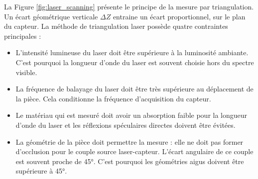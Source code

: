 La Figure \ref{fig:laser_scanning} présente le principe de la mesure par triangulation.
Un écart géométrique verticale $\Delta Z$ entraine un écart proportionnel, sur le plan du capteur.
La méthode de triangulation laser possède quatre contraintes principales :
\begin{itemize}
	\item L'intensité lumineuse du laser doit être supérieure à la luminosité ambiante. C'est pourquoi la longueur d'onde du laser est souvent choisie hors du spectre visible.
	\item La fréquence de balayage du laser doit être très supérieure au déplacement de la pièce. Cela conditionne la fréquence d'acquisition du capteur.
	\item Le matériau qui est mesuré doit avoir un absorption faible pour la longueur d'onde du laser et les réflexions spéculaires directes doivent être évitées.
	\item La géométrie de la pièce doit permettre la mesure : elle ne doit pas former d'occlusion pour le couple source laser-capteur. L'écart angulaire de ce couple est souvent proche de 45°. C'est pourquoi les géométries aigus doivent être supérieure à 45°.
\end{itemize}


